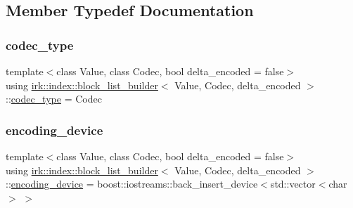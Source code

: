 \subsection{Member Typedef Documentation}
\mbox{\label{classirk_1_1index_1_1block__list__builder_a5f67d973ddc3719baf9b62e19c6ab875}} 
\subsubsection{\texorpdfstring{codec\+\_\+type}{codec\_type}}
{\footnotesize\ttfamily template$<$class Value, class Codec, bool delta\+\_\+encoded = false$>$ \\
using \mbox{\hyperlink{classirk_1_1index_1_1block__list__builder}{irk\+::index\+::block\+\_\+list\+\_\+builder}}$<$ Value, Codec, delta\+\_\+encoded $>$\+::\mbox{\hyperlink{classirk_1_1index_1_1block__list__builder_a5f67d973ddc3719baf9b62e19c6ab875}{codec\+\_\+type}} =  Codec}

\mbox{\label{classirk_1_1index_1_1block__list__builder_a860cd8cc2694c917a48d1de1c221d00f}} 
\subsubsection{\texorpdfstring{encoding\+\_\+device}{encoding\_device}}
{\footnotesize\ttfamily template$<$class Value, class Codec, bool delta\+\_\+encoded = false$>$ \\
using \mbox{\hyperlink{classirk_1_1index_1_1block__list__builder}{irk\+::index\+::block\+\_\+list\+\_\+builder}}$<$ Value, Codec, delta\+\_\+encoded $>$\+::\mbox{\hyperlink{classirk_1_1index_1_1block__list__builder_a860cd8cc2694c917a48d1de1c221d00f}{encoding\+\_\+device}} =  boost\+::iostreams\+::back\+\_\+insert\+\_\+device$<$std\+::vector$<$char$>$ $>$}

\mbox{\label{classirk_1_1index_1_1block__list__builder_aee4746d79079e00283a5f7a3ad071b5e}} 
